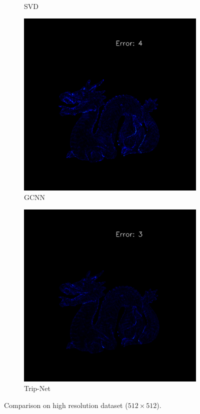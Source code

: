 \begin{figure}[th]
\begin{subfigure}[b]{0.24\linewidth}
		\caption{SVD}
	\end{subfigure}
	\begin{subfigure}[b]{0.24\linewidth}
		\includegraphics[width=\linewidth]{./Figures/comparison_512/fancy_eval_14_error_NNNN-512.png}
		\caption{GCNN}
	\end{subfigure}
	\begin{subfigure}[b]{0.24\linewidth}
		\includegraphics[width=\linewidth]{./Figures/comparison_512/fancy_eval_14_error_Trip-Net-512.png}
		\caption{Trip-Net}
	\end{subfigure}
	\decoRule
	\caption{Comparison on high resolution dataset ($ 512\times 512 $).}
	\label{fig:trip-eval-compare}
\end{figure}


